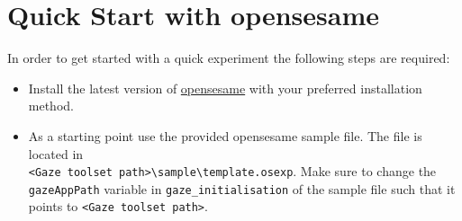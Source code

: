 \documentclass[a4paper,oneside]{book}
\begin{document}
\section{Quick Start with opensesame}
\label{sec.quick.opensesame}
In order to get started with a quick experiment the following steps are required:
\begin{itemize}
    \item Install the latest version of \href{https://osdoc.cogsci.nl/3.3/download/}{opensesame} with your preferred installation method.
    \item As a starting point use the provided opensesame sample file.
        The file is located in\\ \texttt{<Gaze toolset path>\textbackslash sample\textbackslash template.osexp}.
        Make sure to change the \texttt{gazeAppPath} variable in \texttt{gaze\_initialisation} of the sample file such that it points to \texttt{<Gaze toolset path>}.
\end{itemize}
\end{document}
